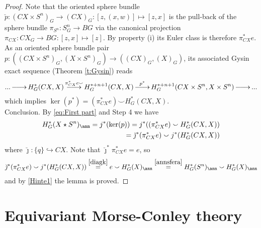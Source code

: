 \documentclass[11pt,a4paper,reqno]{article}
\DeclareMathOperator*{\ttoup}{\llongrightarrow}
\DeclareRobustCommand{\llongrightarrow}{\relbar\joinrel\relbar\joinrel\rightarrow}
\numberwithin{equation}{section}
\theoremstyle{definition}
\begin{document}
\begin{proof}
Note that the oriented sphere bundle $\breve p:(CX\times S^n)_G\to (CX)_G:[z,(x,w)]\mapsto [z,x]$ is the pull-back of the sphere bundle $\pi_{S^n}:S^n_G\to BG$ via the canonical projection $\pi_{CX}:CX_G\to BG:[z,x]\mapsto [z]$. By property (i) its Euler class is therefore  $\pi_{CX}^*e$.
As an oriented sphere bundle pair 
$  p:((CX\times S^n)_G,(X\times S^n)_G)\to ((CX)_G,(X)_G) $, 
its associated Gysin exact sequence (Theorem \ref{t:Gysin}) reads
\begin{align*}
...
\ttoup
H^*_G(CX,X)
\ttoup^{\pi^*_{CX}e \smallsmile}
H^{*+n+1}_G(CX,X)\ttoup^{ p^*}
H^{*+n+1}_G(CX\times S^n,X\times S^n)
\ttoup
... 
\end{align*}
which implies $ \ker(p^*)
=
(\pi^*_{CX}e)\smallsmile H_G^*(CX,X) $.
\\[1mm]
{\sc Conclusion.} By 
\eqref{eq:First part} 
and Step 4  
we have  
\begin{equation}\label{Hinte1}
\begin{aligned}
H^*_G(X \star S^n)_\ann 
= j^*(\ker(p))=j^*((\pi_{CX}^*e)\smallsmile H^*_G(CX,X)) \\
= \breve \jmath^*(\pi_{CX}^*e)\smallsmile j^*(H^*_G(CX,X))
\end{aligned}
\end{equation}
where $\breve \jmath:\{q\}\hookrightarrow CX$.
Note that  $
    \breve \jmath^*\pi_{CX}^*e=e $, so  
\begin{align*}
\breve \jmath^*(\pi_{CX}^*e)\smallsmile j^*(H^*_G(CX,X))
\stackrel{\eqref{diagk}} =
e\smallsmile H^*_G(X)_\ann 
\stackrel{\eqref{annsfera}} =
H_G^*(S^n)_\ann\smallsmile H^*_G(X)_\ann 
\end{align*}
and by \eqref{Hinte1} the lemma is proved.  
\end{proof}



    \section{Equivariant Morse-Conley theory}\label{s:equivariant_Morse_theory}
\end{document}
